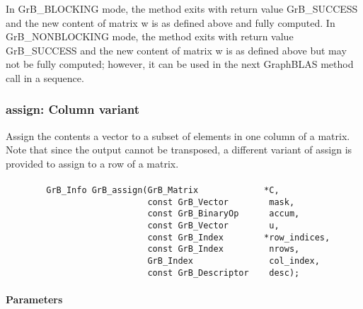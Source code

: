 In {\sf GrB\_BLOCKING} mode, the method exits with return value 
{\sf GrB\_SUCCESS} and the new content of matrix {\sf w} is as defined above
and fully computed.  
In {\sf GrB\_NONBLOCKING} mode, the method exits with return value 
{\sf GrB\_SUCCESS} and the new content of matrix {\sf w} is as defined above 
but may not be fully computed; however, it can be used in the next GraphBLAS 
method call in a sequence.

\subsubsection{{\sf assign}: Column variant}

Assign the contents a vector to a subset of elements in one column of a matrix. 
Note that since the output cannot be transposed, a different variant of
{\sf assign} is provided to assign to a row of a matrix.


\paragraph{\syntax}

\begin{verbatim}
        GrB_Info GrB_assign(GrB_Matrix             *C,
                            const GrB_Vector        mask,
                            const GrB_BinaryOp      accum,
                            const GrB_Vector        u,
                            const GrB_Index        *row_indices,
                            const GrB_Index         nrows,
                            GrB_Index               col_index,
                            const GrB_Descriptor    desc); 
\end{verbatim}

\paragraph{Parameters}

